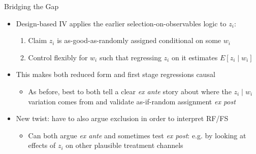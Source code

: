 \documentclass[11pt,english]{beamer}
\begin{document}
\begin{frame}{Bridging the Gap}
\begin{itemize}
\item Design-based IV applies the earlier selection-on-observables logic to $z_i$:\smallskip 

\begin{enumerate}
\item Claim $z_i$ is as-good-as-randomly assigned conditional on some $w_i$\smallskip\pause{}
\item Control flexibly for $w_i$ such that regressing $z_i$ on it estimates $E[z_i\mid w_i]$
\end{enumerate}\bigskip\pause{}
\item This makes both reduced form and first stage regressions causal \smallskip\pause{}
\begin{itemize}
\item As before, best to both tell a clear \emph{ex ante} story about where the $z_i\mid w_i$ variation comes from and validate as-if-random assignment \emph{ex post}
\end{itemize}\bigskip\pause{}
\item New twist: have to also argue exclusion in order to interpret RF/FS\smallskip
\begin{itemize}
\item Can both argue \emph{ex ante} and sometimes test \emph{ex post}: e.g. by looking at effects of $z_i$ on other plausible treatment channels 
\end{itemize}
\end{itemize}


\end{frame}
\end{document}
